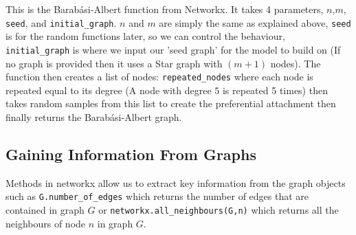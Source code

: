 \documentclass{article}
\begin{document}
        This is the Barabási-Albert function from Networkx. It takes 4 parameters, $n$,$m$, \verb|seed|, and \verb|initial_graph|. $n$ and $m$ are simply the same as explained above, \verb|seed| is for the random functions later, so we can control the behaviour,  \verb|initial_graph| is where we input our 'seed graph' for the model to build on (If no graph is provided then it uses a Star graph with $(m+1)$ nodes). The function then creates a list of nodes: \verb|repeated_nodes| where each node is repeated equal to its degree (A node with degree $5$ is repeated 5 times) then takes random samples from this list to create the preferential attachment then finally returns the Barabási-Albert graph. 
        
        \subsection{Gaining Information From Graphs}
        Methods in networkx allow us to extract key information from the graph objects such as \verb|G.number_of_edges| which returns the number of edges that are contained in graph $G$ or \verb|networkx.all_neighbours(G,n)| which returns all the neighbours of node $n$ in graph $G$.
\printbibliography
\end{document}
